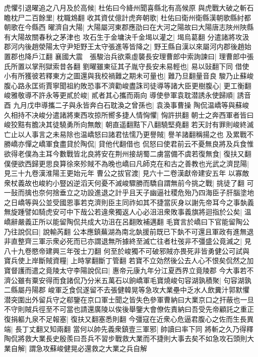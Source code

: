 虎懼引退曜追之八月及於高候|{
	杜佑曰今絳州聞喜縣北有高候原}
與虎戰大破之斬石瞻枕尸二百餘里|{
	枕職鴆翻}
收其資仗億計虎奔朝歌|{
	杜佑曰衛州衛縣漢朝歌縣紂都朝歌在今縣西}
曜濟自大陽|{
	大陽屬河東郡應劭曰在大河之陽故曰大陽唐志陜州陜縣有大陽故關春秋之茅津也}
攻石生于金墉決千金堨以灌之|{
	堨烏葛翻}
分遣諸將攻汲郡河内後趙滎陽太守尹矩野王太守張進等皆降之|{
	野王縣自漢以來屬河内郡後趙始置郡也降戶江翻}
襄國大震　張駿治兵欲乘虛襲長安理曹郎中索詢諫曰|{
	理曹郎中張氏所置以掌刑獄索昔各翻}
劉曜雖東征其子胤守長安未易輕也|{
	易以䜴翻下同}
借使小有所獲彼若釋東方之圖還與我校禍難之期未可量也|{
	難乃旦翻量音良}
駿乃止蘇峻腹心路永匡術賈寧聞祖約敗恐事不濟勸峻盡誅司徒導等諸大臣更樹腹心|{
	更工衡翻}
峻雅敬導不許永等更貳於峻|{
	貳者其心攜而兩向}
導使參軍袁耽潜誘永使歸順|{
	誘音酉}
九月戊申導攜二子與永皆奔白石耽渙之曾孫也|{
	袁渙事曹操}
陶侃温嶠等與蘇峻久相持不决峻分遣諸將東西攻掠所嚮多捷人情恟懼|{
	恟許拱翻}
朝士之奔西軍者皆曰峻狡黠有膽决其徒驍勇所向無敵|{
	朝直遥翻黠下八翻驍堅堯翻}
若天討有罪則峻終滅亡止以人事言之未易除也温嶠怒曰諸君怯懦乃更譽賊|{
	譽羊諸翻稱揚之也}
及累戰不勝嶠亦憚之嶠軍食盡貸於陶侃|{
	貸他代翻借也}
侃怒曰使君前云不憂無良將及兵食惟欲得老僕為主耳今數戰皆北良將安在荆州接胡蜀二虜當備不虞若復無食|{
	復扶又翻}
僕便欲西歸更思良算徐來殄賊不為晚也嶠曰凡師克在和古之善教也光武之濟昆陽|{
	見三十九卷漢淮陽王更始元年}
曹公之拔官渡|{
	見六十二卷漢獻帝建安五年}
以寡敵衆杖義故也峻約小豎凶逆滔天何憂不滅峻驟勝而驕自謂無前今挑之戰|{
	挑徒了翻}
可一鼔而擒也奈何捨垂立之功設進退之計乎且天子幽逼社稷危殆乃四海臣子肝腦塗地之日嶠等與公並受國恩事若克濟則臣主同祚如其不捷當灰身以謝先帝耳今之事埶義無旋踵譬如騎虎安可中下哉公若違衆獨返人心必沮沮衆敗事義旗將迴指於公矣|{
	温嶠辭嚴義正所以能留陶侃共成大功沮在呂翻敗補邁翻}
毛寶言於嶠曰下官能留陶公乃往說侃曰|{
	說輸芮翻}
公本應鎮蕪湖為南北埶援前既已下埶不可還且軍政有進無退非直整齊三軍示衆必死而已亦謂退無所據終至滅亡往者杜弢非不彊盛公竟滅之|{
	見八十九卷愍帝建興三年弢士刀翻}
何至於峻獨不可破邪賊亦畏死非皆勇健公可試與寶兵使上岸斷賊資糧|{
	上時掌翻斷丁管翻}
若寶不立効然後公去人心不恨矣侃然之加寶督護而遣之竟陵太守李陽說侃曰|{
	惠帝元康九年分江夏西界立竟陵郡}
今大事若不濟公雖有粟安得而食諸侃乃分米五萬石以餉嶠軍毛寶燒峻句容湖孰積聚|{
	句容湖孰二縣屬丹陽郡}
峻軍乏食侃遂留不去張健韓晃等急攻大業壘中乏水人飲糞汁郭默懼潜突圍出外留兵守之郗鑒在京口軍士聞之皆失色參軍曹納曰大業京口之扞蔽也一旦不守則賊兵徑至不可當也請還廣陵以俟後舉鑒大會僚佐責納曰吾受先帝顧託之重正復捐軀九泉不足報塞|{
	復扶又翻塞悉則翻}
今彊寇在近衆心危逼君腹心之佐而生長異端|{
	長丁丈翻又知兩翻}
當何以帥先義衆鎮壹三軍邪|{
	帥讀曰率下同}
將斬之久乃得釋陶侃將救大業長史殷羨曰吾兵不習步戰救大業而不捷則大事去矣不如急攻石頭則大業自解|{
	謂急攻蘇峻健晃必還救之大業之兵自解}

